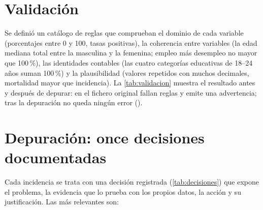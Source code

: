 \section{Validación}

Se definió un catálogo de  reglas que comprueban el dominio de cada variable
(porcentajes entre 0 y 100, tasas positivas), la coherencia entre variables (la edad mediana
total entre la masculina y la femenina; empleo más desempleo no mayor que 100\,\%), las
identidades contables (las cuatro categorías educativas de 18--24 años suman 100\,\%) y la
plausibilidad (valores repetidos con muchos decimales, mortalidad mayor que incidencia). La
\cref{tab:validacion} muestra el resultado antes y después de depurar: en el fichero original
fallan  reglas y  emite una advertencia; tras la
depuración no queda ningún error ().



\section{Depuración: once decisiones documentadas}

Cada incidencia se trata con una decisión registrada (\cref{tab:decisiones}) que expone el
problema, la evidencia que lo prueba con los propios datos, la acción y su justificación. Las
más relevantes son:

